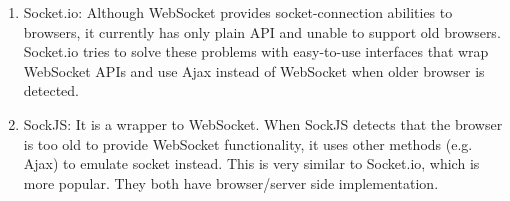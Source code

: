 \begin{enumerate}
\item Socket.io:
  Although WebSocket provides socket-connection abilities to browsers, it currently has only plain API and unable to support old browsers. Socket.io tries to solve these problems with easy-to-use interfaces that wrap WebSocket APIs and use Ajax instead of WebSocket when older browser is detected.

\item SockJS:
  It is a wrapper to WebSocket. When SockJS detects that the browser is too old to provide WebSocket functionality, it uses other methods (e.g. Ajax) to emulate socket instead. This is very similar to Socket.io, which is more popular. They both have browser/server side implementation.

\end{enumerate}
